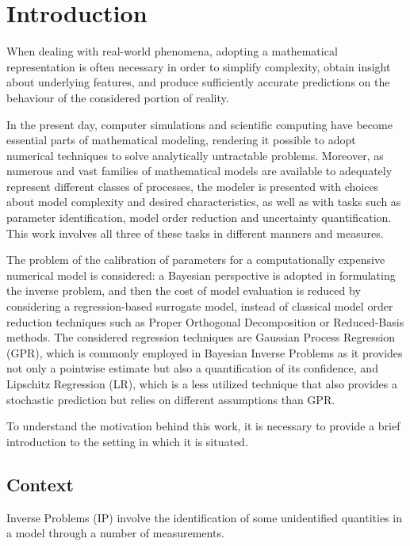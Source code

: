 \section{Introduction} \label{sec:intro}

When dealing with real-world phenomena, adopting a mathematical representation is often necessary in order to simplify complexity, obtain insight about underlying features, and produce sufficiently accurate predictions on the behaviour of the considered portion of reality. 

In the present day, computer simulations and scientific computing have become essential parts of mathematical modeling, rendering it possible to adopt numerical techniques to solve analytically untractable problems.
Moreover, as numerous and vast families of mathematical models are available to adequately represent different classes of processes, the modeler is presented with choices about model complexity and desired characteristics, as well as with tasks such as parameter identification, model order reduction and uncertainty quantification. 
This work involves all three of these tasks in different manners and measures. 

The problem of the calibration of parameters for a computationally expensive numerical model is considered: a Bayesian perspective is adopted in formulating the inverse problem, and then the cost of model evaluation is reduced by considering a regression-based surrogate model, instead of classical model order reduction techniques such as Proper Orthogonal Decomposition or Reduced-Basis methods.
The considered regression techniques are Gaussian Process Regression (GPR), which is commonly employed in Bayesian Inverse Problems as it provides not only a pointwise estimate but also a quantification of its confidence, and Lipschitz Regression (LR), which is a less utilized technique that also provides a stochastic prediction but relies on different assumptions than GPR. 

To understand the motivation behind this work, it is necessary to provide a brief introduction to the setting in which it is situated.

\subsection{Context}\label{sec:context}

Inverse Problems (IP) involve the identification of some unidentified quantities in a model through a number of measurements.

